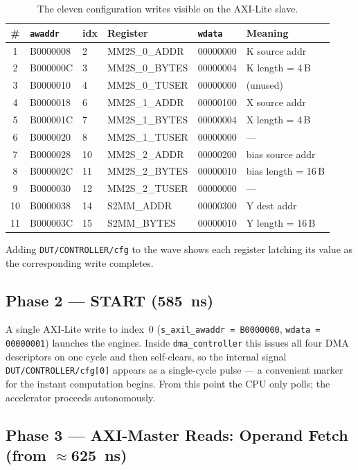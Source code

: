 \begin{table}[h]
\centering
\begin{tabular}{clllll}
\toprule
\# & \texttt{awaddr} & idx & Register & \texttt{wdata} & Meaning \\
\midrule
1  & B0000008 & 2  & MM2S\_0\_ADDR  & 00000000 & K source addr \\
2  & B000000C & 3  & MM2S\_0\_BYTES & 00000004 & K length = 4\,B \\
3  & B0000010 & 4  & MM2S\_0\_TUSER & 00000000 & (unused) \\
4  & B0000018 & 6  & MM2S\_1\_ADDR  & 00000100 & X source addr \\
5  & B000001C & 7  & MM2S\_1\_BYTES & 00000004 & X length = 4\,B \\
6  & B0000020 & 8  & MM2S\_1\_TUSER & 00000000 & --- \\
7  & B0000028 & 10 & MM2S\_2\_ADDR  & 00000200 & bias source addr \\
8  & B000002C & 11 & MM2S\_2\_BYTES & 00000010 & bias length = 16\,B \\
9  & B0000030 & 12 & MM2S\_2\_TUSER & 00000000 & --- \\
10 & B0000038 & 14 & S2MM\_ADDR     & 00000300 & Y dest addr \\
11 & B000003C & 15 & S2MM\_BYTES    & 00000010 & Y length = 16\,B \\
\bottomrule
\end{tabular}
\caption{The eleven configuration writes visible on the AXI-Lite slave.}
\label{tab:cfg}
\end{table}

Adding \texttt{DUT/CONTROLLER/cfg} to the wave shows each register latching its
value as the corresponding write completes.

\subsection{Phase 2 --- START (\SI{585}{ns})}

A single AXI-Lite write to index~0 (\texttt{s\_axil\_awaddr = B0000000},
\texttt{wdata = 00000001}) launches the engines. Inside \texttt{dma\_controller}
this issues all four DMA descriptors on one cycle and then self-clears, so the
internal signal \texttt{DUT/CONTROLLER/cfg[0]} appears as a single-cycle pulse
--- a convenient marker for the instant computation begins. From this point the
CPU only polls; the accelerator proceeds autonomously.

\subsection{Phase 3 --- AXI-Master Reads: Operand Fetch (from $\approx$\SI{625}{ns})}

